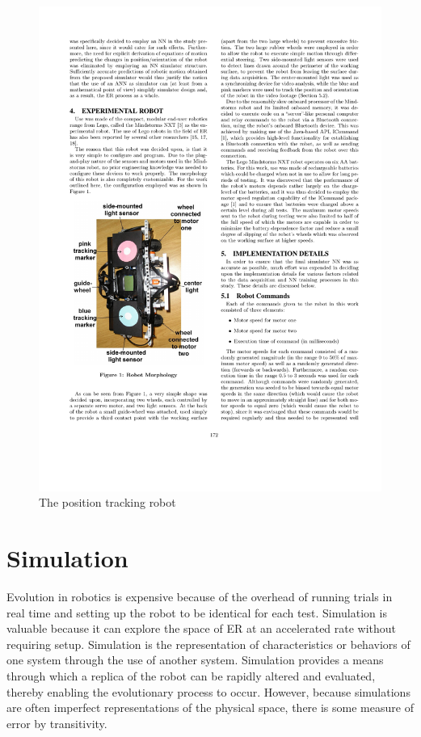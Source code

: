 \documentclass{sig-alternate}
\begin{document}
\begin{figure}%
  \includegraphics[scale=1]{cr1}
\caption{The position tracking robot}
\label{fig:pRobot}
\end{figure}
	
\section{Simulation}\label{simulation}
Evolution in robotics is expensive because of the overhead of running trials in real time and setting up the robot to be identical for each test. Simulation is valuable because it can explore the space of ER at an accelerated rate without requiring setup. Simulation is the representation of characteristics or behaviors of one system through the use of another system. Simulation provides a means through which a replica  of the robot can be rapidly altered and evaluated, thereby enabling the evolutionary process to occur. However, because simulations are often imperfect representations of the physical space, there is some measure of error by transitivity.
\end{document}
